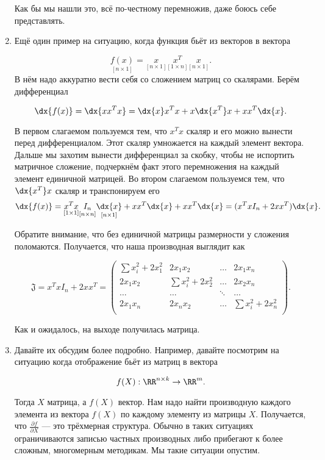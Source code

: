 \begin{sol}
\begin{enumerate}
Как бы мы нашли это, всё по-честному перемножив, даже боюсь себе представлять. 

\item Ещё один пример на ситуацию, когда функция бьёт из векторов в вектора

\[ 
\underset{[n \times 1]}{f(x)} = \underset{[n \times 1]}{x} \underset{[1 \times n]}{x^T}  \underset{[n \times 1]}{x}.
\]
В нём надо аккуратно вести себя со сложением матриц со скалярами. Берём дифференциал 

\[
\dx{f(x)} = \dx{xx^Tx} = \dx{x}x^Tx + x \dx{x^T} x + xx^T\dx{x}.
\]

В первом слагаемом пользуемся тем, что $x^Tx$ скаляр и его можно вынести перед дифференциалом. Этот скаляр умножается на каждый элемент вектора. Дальше мы захотим вынести дифференциал за скобку, чтобы не испортить матричное сложение, подчеркнём факт этого перемножения на каждый элемент единичной матрицей. Во втором слагаемом пользуемся тем, что $\dx{x^T} x$ скаляр и транспонируем его 
\[
\dx{f(x)} = \underset{[1 \times 1]}{x^Tx} \underset{[n \times n]}{I_n} \underset{[n \times 1]}{\dx{x}} + x x^T \dx{x} + xx^T\dx{x} = (x^Tx I_n + 2 x x^T)\dx{x}.
\]

Обратите внимание, что без единичной матрицы размерности у сложения поломаются. Получается, что наша производная выглядит как 

\[
\mathfrak{J} = x^Tx I_n + 2 x x^T = \begin{pmatrix} \sum x_i^2 + 2 x_1^2 & 2 x_1 x_2 & \ldots & 2 x_1 x_n \\
2 x_1 x_2 & \sum x_i^2 + 2 x_2^2 & \ldots & 2 x_2 x_n \\
\ldots & \ldots & \ddots &\ldots \\
2 x_1 x_n & 2 x_n x_2 & \ldots & \sum x_i^2 + 2 x_n^2 \\
\end{pmatrix}.
\]

Как и ожидалось, на выходе получилась матрица.


\item {} Давайте их обсудим более подробно. Например, давайте посмотрим на ситуацию когда отображение бьёт из матриц в вектора

\[
f(X) : \RR^{n \times k} \to \RR^m.
\]

Тогда $X$ матрица, а $f(X)$ вектор. Нам надо найти производную каждого элемента из вектора $f(X)$ по каждому элементу из матрицы $X$. Получается, что $\frac{\partial f}{\partial X}$ --- это трёхмерная структура. Обычно в таких ситуациях ограничиваются записью частных производных либо прибегают к более сложным, многомерным методикам. Мы такие ситуации опустим. 
\end{enumerate} 
\end{sol}

